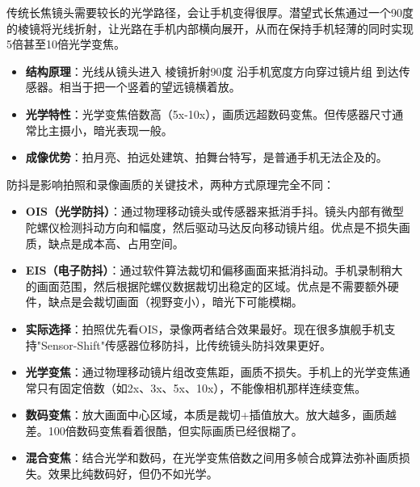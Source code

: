 传统长焦镜头需要较长的光学路径，会让手机变得很厚。潜望式长焦通过一个90度的棱镜将光线折射，让光路在手机内部横向展开，从而在保持手机轻薄的同时实现5倍甚至10倍光学变焦。

\begin{itemize}
  \item \textbf{结构原理}：光线从镜头进入 棱镜折射90度 沿手机宽度方向穿过镜片组 到达传感器。相当于把一个竖着的望远镜横着放。
  \item \textbf{光学特性}：光学变焦倍数高（5x-10x），画质远超数码变焦。但传感器尺寸通常比主摄小，暗光表现一般。
  \item \textbf{成像优势}：拍月亮、拍远处建筑、拍舞台特写，是普通手机无法企及的。
\end{itemize}


防抖是影响拍照和录像画质的关键技术，两种方式原理完全不同：

\begin{itemize}
  \item \textbf{OIS（光学防抖）}：通过物理移动镜头或传感器来抵消手抖。镜头内部有微型陀螺仪检测抖动方向和幅度，然后驱动马达反向移动镜片组。优点是不损失画质，缺点是成本高、占用空间。
  \item \textbf{EIS（电子防抖）}：通过软件算法裁切和偏移画面来抵消抖动。手机录制稍大的画面范围，然后根据陀螺仪数据裁切出稳定的区域。优点是不需要额外硬件，缺点是会裁切画面（视野变小），暗光下可能模糊。
  \item \textbf{实际选择}：拍照优先看OIS，录像两者结合效果最好。现在很多旗舰手机支持"Sensor-Shift"传感器位移防抖，比传统镜头防抖效果更好。
\end{itemize}


\begin{itemize}
  \item \textbf{光学变焦}：通过物理移动镜片组改变焦距，画质不损失。手机上的光学变焦通常只有固定倍数（如2x、3x、5x、10x），不能像相机那样连续变焦。
  \item \textbf{数码变焦}：放大画面中心区域，本质是裁切+插值放大。放大越多，画质越差。100倍数码变焦看着很酷，但实际画质已经很糊了。
  \item \textbf{混合变焦}：结合光学和数码，在光学变焦倍数之间用多帧合成算法弥补画质损失。效果比纯数码好，但仍不如光学。
\end{itemize}


